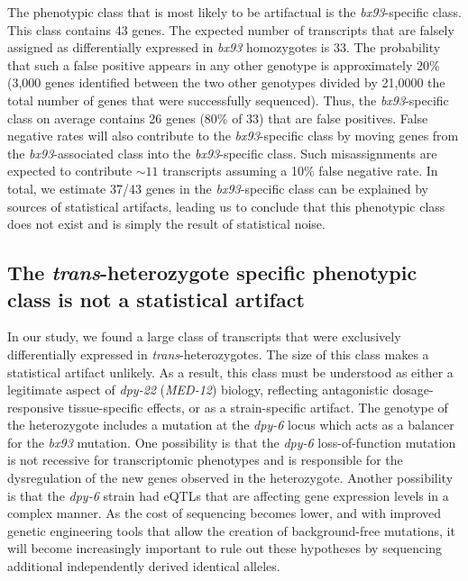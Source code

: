 \documentclass[10pt, twocolumn]{article}
\newcommand{\gene}[1]{\mbox{\emph{#1}}}
\newcommand{\dpy}{\gene{dpy-22} (\emph{MED-12})}
\begin{document}
The phenotypic class that is most likely to be artifactual is the \emph{bx93}-specific
class. This class contains 43 genes. The expected number of transcripts that
are falsely assigned as differentially expressed in \emph{bx93} homozygotes is
33. The probability that such a false positive appears in any other genotype is
approximately 20\% (3,000 genes identified between the two other genotypes divided
by 21,0000 the total number of genes that were successfully sequenced). Thus,
the \emph{bx93}-specific class on average contains 26 genes (80\% of 33) that
are false positives. False negative rates will also contribute to the
\emph{bx93}-specific class by moving genes from the \emph{bx93}-associated class
into the \emph{bx93}-specific class. Such misassignments are expected to
contribute $\sim 11$ transcripts assuming a 10\% false negative rate. In total,
we estimate 37/43 genes in the \emph{bx93}-specific class can be explained by
sources of statistical artifacts, leading us to conclude that this phenotypic
class does not exist and is simply the result of statistical noise.

\subsection*{The \emph{trans}-heterozygote specific phenotypic class is not a
             statistical artifact}
In our study, we found a large class of transcripts that were exclusively
differentially expressed in \emph{trans}-heterozygotes. The size of this class
makes a statistical artifact unlikely. As a result, this class must be understood
as either a legitimate aspect of \dpy{} biology, reflecting antagonistic
dosage-responsive tissue-specific effects, or as a strain-specific artifact.
The genotype of the
heterozygote includes a mutation at the \gene{dpy-6} locus which acts as a balancer
for the
\emph{bx93} mutation. One possibility is that the \emph{dpy-6} loss-of-function
mutation is not recessive for transcriptomic phenotypes and is responsible for
the dysregulation of the new genes observed in the heterozygote. Another
possibility is that the \emph{dpy-6} strain had eQTLs that are affecting gene
expression levels in a complex manner. As the cost of sequencing becomes
lower, and with improved genetic engineering tools that allow the creation of
background-free mutations, it will become increasingly important to rule out
these hypotheses by sequencing additional independently derived identical
alleles.
\end{document}
